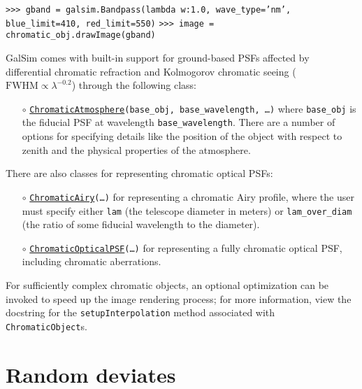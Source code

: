 \documentclass[preprint,10pt]{../../devel/modules/aastex}
\begin{document}
\texttt{>>> gband = galsim.Bandpass(lambda w:1.0, wave\_type='nm', blue\_limit=410, red\_limit=550)} \newline
\texttt{>>> image = chromatic\_obj.drawImage(gband)}

GalSim comes with built-in support for ground-based PSFs affected by differential chromatic
refraction and Kolmogorov chromatic seeing ($\mathrm{FWHM} \propto \lambda^{-0.2}$) through the
following class:
\begin{itemize}
  \item[$\circ$]
  \texttt{\href{http://galsim-developers.github.io/GalSim/classgalsim_1_1chromatic_1_1_chromatic_atmosphere.html}{ChromaticAtmosphere}\texttt{(base\_obj, base\_wavelength, \dots)}}
    \newline
    where \texttt{base\_obj} is the fiducial PSF at wavelength \texttt{base\_wavelength}.
    There are a number of options for specifying details like the position of the object with
    respect to zenith and the physical properties of the atmosphere.
\end{itemize}

There are also classes for representing chromatic optical PSFs:
\begin{itemize}
   \item[$\circ$]
   \texttt{\href{http://galsim-developers.github.io/GalSim/classgalsim_1_1chromatic_1_1_chromatic_airy.html}{ChromaticAiry}\texttt{(\dots)}}
    \newline
   for representing a chromatic Airy profile, where the user must specify either \texttt{lam} (the
   telescope diameter in meters) or \texttt{lam\_over\_diam} (the ratio of some fiducial wavelength
   to the diameter).
   \item[$\circ$]
   \texttt{\href{http://galsim-developers.github.io/GalSim/classgalsim_1_1chromatic_1_1_chromatic_optical_p_s_f.html}{ChromaticOpticalPSF}\texttt{(\dots)}}
    \newline
   for representing a fully chromatic optical PSF, including chromatic aberrations.
\end{itemize}

For sufficiently complex chromatic objects, an optional optimization can be invoked to speed up the
image rendering process; for more information, view the docstring for the
\texttt{setupInterpolation} method associated with \texttt{ChromaticObject}s.

\section{Random deviates}\label{sect:random}
\end{document}
